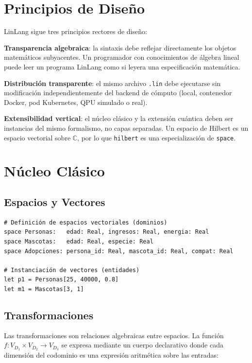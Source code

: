 \documentclass[12pt, a4paper, openany]{report}
\theoremstyle{definition}
\begin{document}
\section{Principios de Diseño}

LinLang sigue tres principios rectores de diseño:

\textbf{Transparencia algebraica}: la sintaxis debe reflejar directamente los objetos matemáticos subyacentes. Un programador con conocimientos de álgebra lineal puede leer un programa LinLang como si leyera una especificación matemática.

\textbf{Distribución transparente}: el mismo archivo \texttt{.lin} debe ejecutarse sin modificación independientemente del backend de cómputo (local, contenedor Docker, pod Kubernetes, QPU simulado o real).

\textbf{Extensibilidad vertical}: el núcleo clásico y la extensión cuántica deben ser instancias del mismo formalismo, no capas separadas. Un espacio de Hilbert es un espacio vectorial sobre $\mathbb{C}$, por lo que \texttt{hilbert} es una especialización de \texttt{space}.

\section{Núcleo Clásico}

\subsection{Espacios y Vectores}

\begin{lstlisting}[caption={Definición de espacios y vectores}]
# Definición de espacios vectoriales (dominios)
space Personas:   edad: Real, ingresos: Real, energia: Real
space Mascotas:   edad: Real, especie: Real
space Adopciones: persona_id: Real, mascota_id: Real, compat: Real

# Instanciación de vectores (entidades)
let p1 = Personas[25, 40000, 0.8]
let m1 = Mascotas[3, 1]
\end{lstlisting}

\subsection{Transformaciones}

Las transformaciones son relaciones algebraicas entre espacios. La función $f: V_{D_1} \times V_{D_2} \to V_{D_3}$ se expresa mediante un cuerpo declarativo donde cada dimensión del codominio es una expresión aritmética sobre las entradas:
\end{document}

